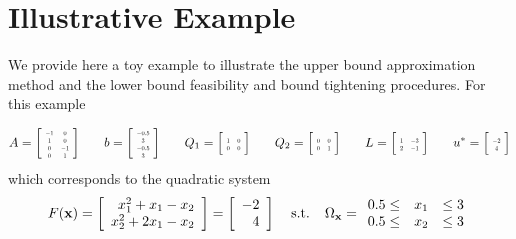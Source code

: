 \section{Illustrative Example} \label{sec:expl}

We provide here a toy example to illustrate the upper bound approximation method and the lower bound feasibility and bound tightening procedures. 
For this example

$$A=
\left[
\scalebox{0.5}{%
	\begin{tabular}{ c c }
	$-1$ & $0$  \\ 
	$1$ & $0$  \\  
	$0$ & $-1$ \\
	$0$ & $1$  
	\end{tabular}%
} 
\right] \hspace*{0.25in} b=
\left[
\scalebox{0.5}{%
	\begin{tabular}{ c }
	$-0.5$  \\ 
	$3$ \\  
	$-0.5$ \\
	$3$  
	\end{tabular}%
} 
\right] \hspace*{0.25in} Q_1=
\left[
\scalebox{0.5}{%
	\begin{tabular}{ c c }
	$1$ & $0$  \\ 
	$0$ & $0$  
	\end{tabular}%
} 
\right] \hspace*{0.25in} Q_2=
\left[
\scalebox{0.5}{%
	\begin{tabular}{ c c }
	$0$ & $0$  \\ 
	$0$ & $1$  
	\end{tabular}%
} 
\right] \hspace*{0.25in} L=
\left[
\scalebox{0.5}{%
	\begin{tabular}{ c c }
	$1$ & $-3$  \\ 
	$2$ & $-1$  
	\end{tabular}%
} 
\right] \hspace*{0.25in} u^*=
\left[
\scalebox{0.5}{%
	\begin{tabular}{ c }
	$-2$  \\ 
	$4$   
	\end{tabular}%
} 
\right]
$$
which corresponds to the quadratic system 
$$F(\mathbf{x})=\left[\begin{array}{r} x_1^2+x_1-x_2 \\ x_2^2+2x_1-x_2 \end{array}\right]=\left[\begin{array}{r} -2 \\ 4 \end{array}\right] \hspace*{0.15in} \text{s.t.} \hspace*{0.15in} \Omega_{\mathbf{x}}=\begin{array}{rcl} 0.5\leq & x_1 & \leq 3 \\ 0.5\leq & x_2 & \leq 3 \end{array} $$

